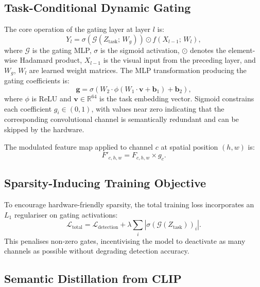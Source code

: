 \documentclass[conference]{IEEEtran}
\begin{document}
\subsection{Task-Conditional Dynamic Gating}

The core operation of the gating layer at layer $l$ is:
\begin{equation}
    Y_l = \sigma\!\left(\mathcal{G}(Z_{\text{task}};\,W_g)\right) \odot f(X_{l-1};\,W_l),
    \label{eq:gating}
\end{equation}
where $\mathcal{G}$ is the gating MLP, $\sigma$ is the sigmoid activation, $\odot$
denotes the element-wise Hadamard product, $X_{l-1}$ is the visual input from the
preceding layer, and $W_g$, $W_l$ are learned weight matrices. The MLP transformation
producing the gating coefficients is:
\begin{equation}
    \mathbf{g} = \sigma\!\left(W_2 \cdot \phi(W_1 \cdot \mathbf{v} + \mathbf{b}_1) + \mathbf{b}_2\right),
    \label{eq:mlp}
\end{equation}
where $\phi$ is ReLU and $\mathbf{v}\in\mathbb{R}^{64}$ is the task embedding
vector. Sigmoid constrains each coefficient $g_i\in(0,1)$, with values near zero
indicating that the corresponding convolutional channel is semantically redundant
and can be skipped by the hardware.

The modulated feature map applied to channel $c$ at spatial position $(h,w)$ is:
\begin{equation}
    F'_{c,h,w} = F_{c,h,w} \times g_c.
    \label{eq:hadamard}
\end{equation}

\subsection{Sparsity-Inducing Training Objective}

To encourage hardware-friendly sparsity, the total training loss incorporates an
$L_1$ regulariser on gating activations:
\begin{equation}
    \mathcal{L}_{\text{total}} = \mathcal{L}_{\text{detection}} + \lambda \sum_{i}\left|\sigma\!\left(\mathcal{G}(Z_{\text{task}})\right)_i\right|.
    \label{eq:loss}
\end{equation}
This penalises non-zero gates, incentivising the model to deactivate as many
channels as possible without degrading detection accuracy.

\subsection{Semantic Distillation from CLIP}
\end{document}
